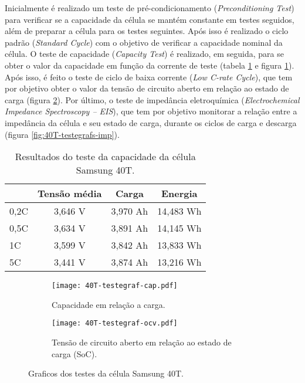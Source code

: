     Inicialmente é realizado um teste de pré-condicionamento (\textit{Preconditioning Test}) para verificar se a capacidade da célula se mantém constante em testes seguidos, além de preparar a célula para os testes seguintes. Após isso é realizado o ciclo padrão (\textit{Standard Cycle}) com o objetivo de verificar a capacidade nominal da célula. O teste de capacidade (\textit{Capacity Test}) é realizado, em seguida, para se obter o valor da capacidade em função da corrente de teste (tabela \ref{tab:40T-testeresultados-cap} e figura \ref{fig:40T-testegraf-cap}). Após isso, é feito o teste de ciclo de baixa corrente (\textit{Low C-rate Cycle}), que tem por objetivo obter o valor da tensão de circuito aberto em relação ao estado de carga (figura \ref{fig:40T-testegraf-ocv}). Por último, o teste de impedância eletroquímica (\textit{Electrochemical Impedance Spectroscopy – EIS}), que tem por objetivo monitorar a relação entre a impedância da célula e seu estado de carga, durante os ciclos de carga e descarga (figura \ref{fig:40T-testegrafs-imp}).

    \begin{table}[!htp]
        \centering
        \caption{Resultados do teste da capacidade da célula Samsung 40T.}
        \label{tab:40T-testeresultados-cap}
        \begin{tabular}{lccc}
           \hline
           \multicolumn{1}{c}{}& Tensão média & Carga & Energia \\
           \hline
           0,2C & 3,646 V & 3,970 Ah & 14,483 Wh \\
           0,5C & 3,634 V & 3,891 Ah & 14,145 Wh \\
           1C   & 3,599 V & 3,842 Ah & 13,833 Wh \\
           5C   & 3,441 V & 3,874 Ah & 13,216 Wh \\
           \hline
        \end{tabular}
    \end{table}
    
    \begin{figure}[!htb]
    \centering
        \begin{subfigure}{0.48\linewidth}
            \centering
            \texttt{[image: 40T-testegraf-cap.pdf]}
            \caption{Capacidade em relação a carga.}
            \label{fig:40T-testegraf-cap}
        \end{subfigure}
        \hspace*{\fill}
        \begin{subfigure}{0.48\linewidth}
            \centering
            \texttt{[image: 40T-testegraf-ocv.pdf]}
            \caption{Tensão de circuito aberto em relação ao estado de carga (SoC).}
            \label{fig:40T-testegraf-ocv}
        \end{subfigure}
    \caption{Graficos dos testes da célula Samsung 40T.}
    \label{fig:40T-testegrafs-cap}
    \end{figure}
     
